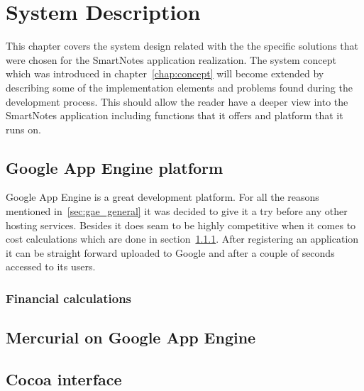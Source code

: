 \chapter{System Description}\label{chap:sys_description}
This chapter covers the system design related with the the specific solutions that were chosen for the SmartNotes application realization. The system concept which was introduced in chapter~\ref{chap:concept} will become extended by describing some of the implementation elements and problems found during the development process. This should allow the reader have a deeper view into the SmartNotes application including functions that it offers and platform that it runs on.
\section{Google App Engine platform}\label{sec:gae}
Google App Engine is a great development platform. For all the reasons mentioned in~\ref{sec:gae_general} it was decided to give it a try before any other hosting services. Besides it does seam to be highly competitive when it comes to cost calculations which are done in section~\ref{subsec:gae_calculations}.
After registering an application it can be straight forward uploaded to Google and after a couple of seconds accessed to its users. 
\subsection{Financial calculations}\label{subsec:gae_calculations}
\section{Mercurial on Google App Engine}\label{sec:hg_on_gae}
\section{Cocoa interface}\label{sec:cocoa} 